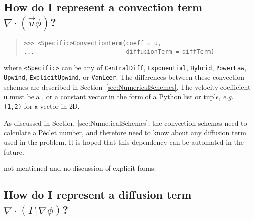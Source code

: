             \subsection{How do I represent a convection term
            $\nabla \cdot \left( \vec{u} \phi \right)$?}
            \hspace*{\fill}
            
            \begin{quote}
\begin{verbatim}
>>> <Specific>ConvectionTerm(coeff = u, 
...                          diffusionTerm = diffTerm)
\end{verbatim}
            \end{quote}
            where \verb|<Specific>| can be any of \verb|CentralDiff|,
            \verb|Exponential|, \verb|Hybrid|, \verb|PowerLaw|,
            \verb|Upwind|, \verb|ExplicitUpwind|, or \verb|VanLeer|.
            The differences between these convection schemes are described
            in Section~\ref{sec:NumericalSchemes}. The velocity coefficient 
            \verb|u| must be a , or a 
            constant vector in the form of a Python list or tuple, 
            \emph{e.g.} \verb|(1,2)| for a vector in 2D.
            
            \begin{reSTadmonition}[Note]
                As discussed in Section~\ref{sec:NumericalSchemes}, the
                convection schemes need to calculate a P\'eclet number,
                and therefore need to know about any diffusion term
                used in the problem.  It is hoped that this dependency
                can be automated in the future.
            \end{reSTadmonition}
            
            \begin{reSTadmonition}[Warning]
                 not mentioned and no discussion of
                explicit forms.
            \end{reSTadmonition}
        
            \subsection{How do I represent a diffusion term
            $\nabla \cdot \left( \Gamma_1 \nabla \phi \right)$?}
            \hspace*{\fill}
            
